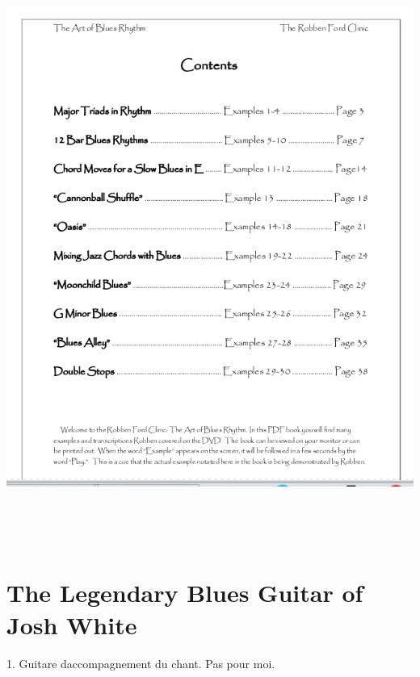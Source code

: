\documentclass[a4paper]{book}
\begin{document}
\begin{center}
\includegraphics[width=16.702cm,height=19.385cm]{lebluessupportsmethodes-img141.png}
\end{center}





\clearpage\section[The Legendary Blues Guitar of Josh White]{The
Legendary Blues Guitar of Josh White}
\hypertarget{RefHeadingToc398973218262}{}1. Guitare
d{\textquotesingle}accompagnement du chant. Pas pour moi.
\end{document}
